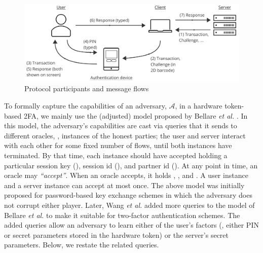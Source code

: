 \begin{figure}
\begin{centering}
\includegraphics[width=12cm]{setup}
\end{centering}
\caption{\label{fig:setup.}Protocol participants and message flows}
\end{figure}
%
To formally capture the capabilities of an adversary, $\mathcal{A}$, in a hardware token-based 2FA,  we mainly use the (adjusted) model proposed by Bellare \textit{et al.} \cite{BellarePR00}. In this model, the adversary’s capabilities are cast via queries that it sends to different oracles, \ie, instances of the honest parties; the user and server interact with each other for some fixed number of flows, until both instances have terminated. By that time, each instance should have accepted holding a particular session key (\seckey), session id (\SID), and partner id (\PID). At any point in time, an oracle may \emph{``accept''}. When an oracle accepts, it holds \seckey, \SID, and \PID. A user instance and a server instance can accept at most once. The above model was initially proposed for password-based key exchange schemes in which the adversary does not corrupt either player.  Later, Wang \textit{et al.} \cite{WangW18}  added more queries to the model of  Bellare \textit{et al.} to make it suitable for two-factor authentication schemes. The added queries allow an adversary to learn either of the user's factors (\ie, either PIN or secret parameters stored in the hardware token) or the server's secret parameters.  Below, we restate the related queries. 
 





